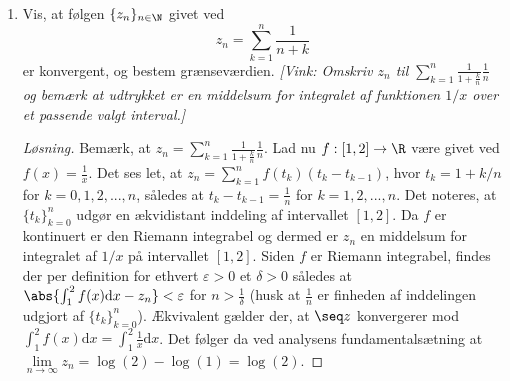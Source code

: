 \begin{opg}
\begin{enumerate}
\begin{proof}[Løsning]
Betragt funktionen $ f:\R\to\R $ givet ved\begin{equation*}
f(x)=\begin{cases}
\frac{\cos(x)-1}{x^2}& x\neq0,\\
-1/2& x=0.
\end{cases}
\end{equation*}
Det ses let, at $ f $ er kontinuert i $ x $ for alle $ x\neq0 $, idet at $ f $ er et produkt af to kontinuerte funktioner på $ \R\setminus\{0\} $. At $ f $ er kontinuert i $ 0 $ ses ved brug af L'H\^opital's regel $ \lim\limits_{x\to0}f(x)=\lim\limits_{x\to 0}\left(\frac{-\sin(x)}{2x}\right)=-1/2 $. Bemærk nu, at $ y_n=f(1/n) $, og det følger da af sætning 1.43 og den velkendte grænse, $ \lim\limits_{n\to\infty}\left(1/n\right)=0 $, at $ \seq y $ er konvergent med grænseværdien $ \lim\limits_{n\to\infty }y_n=f(0)=-1/2 $.
		\end{proof} \fi
		
		
		\item Vis, at f\o{}lgen $\{z_n\}_{n\in\N}$ givet ved
		\[
		z_n=\sum_{k=1}^n\frac1{n+k}
		\]	
		er konvergent, og bestem gr\ae{}nsev\ae{}rdien. \textsl{[Vink: Omskriv 
			$
			z_n$ til $\sum_{k=1}^n\frac1{1+\frac kn}\frac 1n
			$
			og bem\ae{}rk at udtrykket er en middelsum for integralet af funktionen $1/x$ over et passende valgt interval.]}
		
		
		\ifanswers \begin{proof}[Løsning]
			Bemærk, at $ z_n=\sum_{k=1}^{n}\frac{1}{1+\frac{k}{n}}\frac{1}{n} $. Lad nu $ f: [1,2]\to \R $ være givet ved $ f(x)=\frac{1}{x} $. Det ses let, at $ z_n=\sum_{k=1}^{n}f(t_k)(t_k-t_{k-1}) $, hvor $t_k=1+k/n $ for $ k=0,1,2,...,n $, således at $ t_k-t_{k-1}=\frac{1}{n} $ for $ k=1,2,...,n $. Det noteres, at $ \{t_k\}_{k=0}^{n} $ udgør en ækvidistant inddeling af intervallet $ [1,2] $. Da $ f $ er kontinuert er den Riemann integrabel og dermed er $ z_n $ en middelsum for integralet af $ 1/x $ på intervallet $ [1,2] $. Siden $ f $ er Riemann integrabel, findes der per definition for ethvert $ \varepsilon>0 $ et $ \delta>0 $ således at $ \abs{\int_{1}^{2}f(x)\text{d} x-z_n}<\varepsilon $ for $ n>\frac{1}{\delta} $ (husk at $ \frac{1}{n} $ er finheden af inddelingen udgjort af $ \{t_k\}_{k=0}^{n} $). Ækvivalent gælder der, at $ \seq z $ konvergerer mod $ \int_{1}^{2} f(x)\text{d} x=\int_{1}^{2} \frac{1}{x}\text{d} x $. Det følger da ved analysens fundamentalsætning at $ \lim\limits_{n\to\infty}z_n=\log(2)-\log(1)=\log(2) $.
		\end{proof} \fi
	\end{enumerate}
\end{opg}
